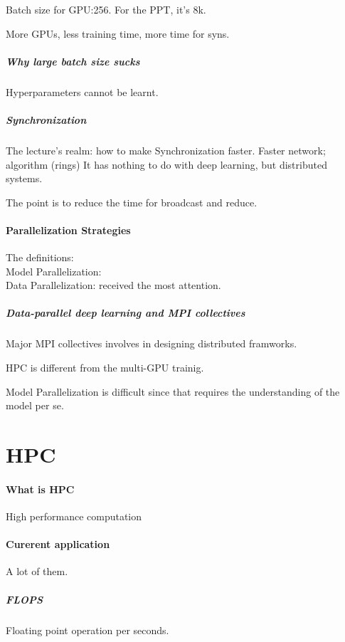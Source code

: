 \documentclass[12pt]{article}
\begin{document}
    Batch size for GPU:256. For the PPT, it's 8k.

    More GPUs, less training time, more time for syns.

    \subparagraph{Why large batch size sucks}
    Hyperparameters cannot be learnt. 

    \subparagraph{Synchronization}
    The lecture's realm: how to make Synchronization faster.
    Faster network; algorithm (rings)
    It has nothing to do with deep learning, but distributed systems.

    The point is to reduce the time for broadcast and reduce.

    \paragraph{Parallelization Strategies} The definitions:
    \\Model Parallelization: 
    \\Data Parallelization: received the most attention.

    \subparagraph{Data-parallel deep learning and MPI collectives}
    Major MPI collectives involves in designing distributed framworks.

    HPC is different from the multi-GPU trainig.

    Model Parallelization is difficult since that requires the understanding of the model per se.


    \section*{HPC}
    \paragraph{What is HPC} High performance computation

    \paragraph{Curerent application}
    A lot of them.

    \subparagraph{FLOPS} Floating point operation per seconds.
    
\end{document}
